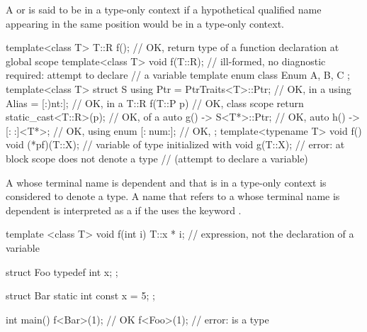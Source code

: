 A  or
is said to be in a type-only context
if a hypothetical qualified name appearing in the same position
would be in a type-only context.
\begin{example}
\begin{codeblock}
template<class T> T::R f();             // OK, return type of a function declaration at global scope
template<class T> void f(T::R);         // ill-formed, no diagnostic required: attempt to declare
                                        // a  variable template
enum class Enum { A, B, C };
template<class T> struct S {
  using Ptr = PtrTraits<T>::Ptr;        // OK, in a 
  using Alias = [:^^int:];              // OK, in a 
  T::R f(T::P p) {                      // OK, class scope
    return static_cast<T::R>(p);        // OK,  of a 
  }
  auto g() -> S<T*>::Ptr;               // OK, 
  auto h() -> [:^^S:]<T*>;              // OK, 
  using enum [:^^Enum:];                // OK, 
};
template<typename T> void f() {
  void (*pf)(T::X);                     // variable  of type  initialized with 
  void g(T::X);                         // error:  at block scope does not denote a type
                                        // (attempt to declare a  variable)
}
\end{codeblock}
\end{example}

\pnum
A 
whose terminal name is dependent and that is in a type-only context
is considered to denote a type.
A name
that refers to a  whose terminal name is dependent
is interpreted as a 
if the  uses the keyword .
\begin{example}
\begin{codeblock}
template <class T> void f(int i) {
  T::x * i;         // expression, not the declaration of a variable 
}

struct Foo {
  typedef int x;
};

struct Bar {
  static int const x = 5;
};

int main() {
  f<Bar>(1);        // OK
  f<Foo>(1);        // error:  is a type
}
\end{codeblock}
\end{example}

